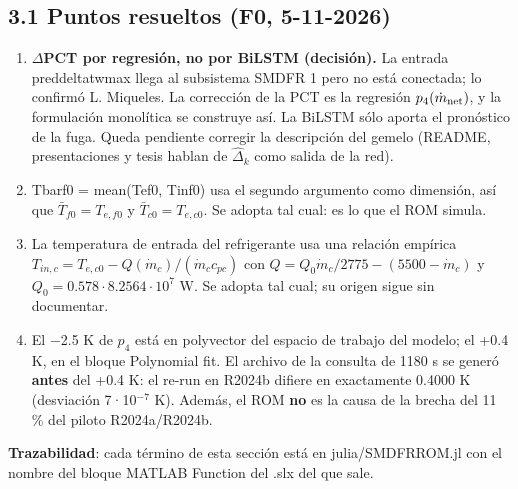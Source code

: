 \documentclass[11pt,a4paper]{article}
\newcommand{\codeus}{\textunderscore\allowbreak}
\newcommand{\code}[1]{{\small\ttfamily\let\_\codeus #1}}
\begin{document}
\subsection*{3.1 Puntos resueltos (F0, 5-11-2026)}
\begin{enumerate}
\item \textbf{$\Delta$PCT por regresión, no por BiLSTM (decisión).} La entrada \code{pred\_delta\_tw\_max} llega al subsistema \code{SMDFR 1} pero no está conectada; lo confirmó L. Miqueles. La corrección de la PCT es la regresión $p_4(\dot m_{\rm net})$, y la formulación monolítica se construye así. La BiLSTM sólo aporta el pronóstico de la fuga. Queda pendiente corregir la descripción del gemelo (README, presentaciones y tesis hablan de $\hat\Delta_k$ como salida de la red).
\item \code{Tbar\_f0 = mean(Te\_f0, Tin\_f0)} usa el segundo argumento como dimensión, así que $\bar T_{f0}=T_{e,f0}$ y $\bar T_{c0}=T_{e,c0}$. Se adopta tal cual: es lo que el ROM simula.
\item La temperatura de entrada del refrigerante usa una relación empírica $T_{in,c}=T_{e,c0}-Q(\dot m_c)/(\dot m_cc_{pc})$ con $Q=Q_0\dot m_c/2775-(5500-\dot m_c)$ y $Q_0=0.578\cdot8.2564\cdot10^7$ W. Se adopta tal cual; su origen sigue sin documentar.
\item El $-$2.5 K de $p_4$ está en \code{poly\_vector} del espacio de trabajo del modelo; el +0.4 K, en el bloque \code{Polynomial fit}. El archivo de la consulta de 1180 s se generó \textbf{antes} del +0.4 K: el re-run en R2024b difiere en exactamente 0.4000 K (desviación 7·10$^{-7}$ K). Además, el ROM \textbf{no} es la causa de la brecha del 11 \% del piloto R2024a/R2024b.
\end{enumerate}

\textbf{Trazabilidad}: cada término de esta sección está en \code{julia/SMDFRROM.jl} con el nombre del bloque MATLAB Function del \code{.slx} del que sale.

\medskip
\end{document}
